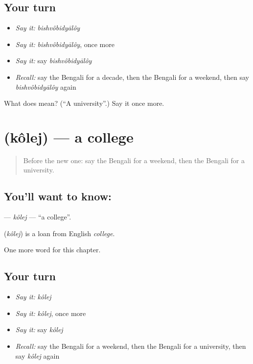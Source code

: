 \subsection*{Your turn}
\begin{itemize}
\raggedright
  \item \emph{Say it:} \emph{bishvôbidyālôy}
  \item \emph{Say it:} \emph{bishvôbidyālôy}, once more
  \item \emph{Say it:} say \emph{bishvôbidyālôy}
  \item \emph{Recall:} say the Bengali for a decade, then the Bengali for a weekend, then say \emph{bishvôbidyālôy} again
\end{itemize}

\begin{tcolorbox}[breakable,colback=teal!4,colframe=teal!35!black,title={Before you move on}]
What does  mean? (\textquotedblleft{}A university\textquotedblright{}.) Say it once more.
\end{tcolorbox}
\section[\texorpdfstring{\bn{কলেজ} (kôlej)}{কলেজ (kôlej)}]{ (kôlej) — a college}

\label{lesson:BN-C188-kolej}



\begin{quote}
Before the new one: say the Bengali for a weekend, then the Bengali for a university.
\end{quote}

\subsection*{You'll want to know: }
\textbf{} — \emph{kôlej} — \textquotedblleft{}a college\textquotedblright{}.

\begin{cousinweb}
\textbf{} (\emph{kôlej}) is a loan from English \emph{college}.
\end{cousinweb}

\begin{grammarlens}[title={What you've built}]
One more word for this chapter.
\end{grammarlens}

\subsection*{Your turn}
\begin{itemize}
\raggedright
  \item \emph{Say it:} \emph{kôlej}
  \item \emph{Say it:} \emph{kôlej}, once more
  \item \emph{Say it:} say \emph{kôlej}
  \item \emph{Recall:} say the Bengali for a weekend, then the Bengali for a university, then say \emph{kôlej} again
\end{itemize}

